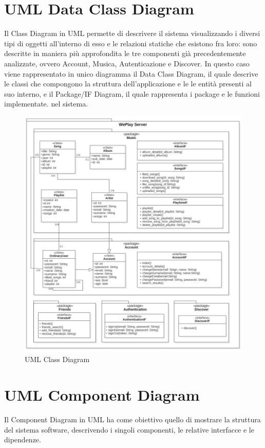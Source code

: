 \section{UML Data Class Diagram}
Il Class Diagram in UML permette di descrivere il sistema 
visualizzando i diversi tipi di oggetti all'interno di esso e le relazioni 
statiche che esistono fra loro: sono descritte in maniera più approfondita 
le tre componenti già precedentemente analizzate, ovvero Account, Musica, 
Autenticazione e Discover.
In questo caso viene rappresentato in unico diagramma il Data Class Diagram, 
il quale descrive le classi che compongono la struttura dell'applicazione e le
le entità presenti al suo interno, e il Package/IF Diagram, il quale rappresenta
i package e le funzioni implementate. 
nel sistema.
\begin{figure}[H]
    \centering
    \includegraphics[scale=0.4]{images/ClassDiagram_ver6.jpg}
    \caption{UML Class Diagram}
    \label{fig-uml-class-diag}
\end{figure}
\newpage

\section{UML Component Diagram}
Il Component Diagram in UML ha come obiettivo quello di mostrare la struttura
del sistema software, descrivendo i singoli componenti, le relative interfacce 
e le dipendenze. 

